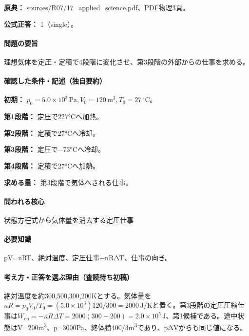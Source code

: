 \noindent\textbf{原典：} sources/R07/17\_applied\_science.pdf、PDF物理3頁。

\textbf{公式正答：} 1（single）。

\paragraph{問題の要旨} 理想気体を定圧・定積で4段階に変化させ、第3段階の外部からの仕事を求める。

\paragraph{確認した条件・記述（独自要約）}\mbox{}\par

\noindent\textbf{初期：} \(p_0=5.0\times10^3\,\mathrm{Pa},V_0=120\,\mathrm{m}^3,T_0=27\,{}^\circ\mathrm{C}\)。\par

\noindent\textbf{第1段階：} 定圧で227°Cへ加熱。\par

\noindent\textbf{第2段階：} 定積で27°Cへ冷却。\par

\noindent\textbf{第3段階：} 定圧で−73°Cへ冷却。\par

\noindent\textbf{第4段階：} 定積で27°Cへ加熱。\par

\noindent\textbf{求める量：} 第3段階で気体へされる仕事。\par

\paragraph{問われる核心} 状態方程式から気体量を消去する定圧仕事

\paragraph{必要知識} pV=\allowbreak{}nRT、絶対温度、定圧仕事−nRΔT、仕事の向き。

\paragraph{考え方・正答を選ぶ理由（査読待ち初稿）} 絶対温度を約300,500,300,200Kとする。気体量を\(nR=p_0V_0/T_0=(5.0\times10^3)120/300=2000\,\mathrm{J/K}\)と置く。第3段階の定圧圧縮仕事は\(W_{\mathrm{on}}=-nR\Delta T=2000(300-200)=2.0\times10^5\,\mathrm{J}\)、第1候補である。途中状態はV=\allowbreak{}200m\textsuperscript{3}、p=\allowbreak{}3000Pa、終体積400/3m\textsuperscript{3}であり、pΔVからも同じ値になる。

